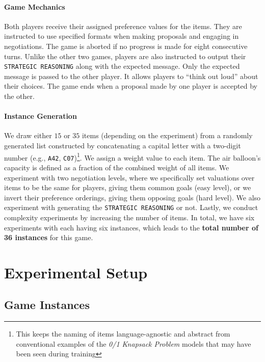 \documentclass[11pt]{article}
\begin{document}
\paragraph{Game Mechanics}
Both players receive their assigned preference values for the items. They are instructed to use specified formats when making proposals and engaging in negotiations. The game is aborted if no progress is made for eight consecutive turns. 
Unlike the other two games, players are also instructed to output their \texttt{STRATEGIC REASONING} along with the expected message. Only the expected message is passed to the other player. It allows players to ``think out loud'' about their choices. The game ends when a proposal made by one player is accepted by the other.

\paragraph{Instance Generation}

We draw either $15$ or $35$ items (depending on the experiment) from a randomly generated list constructed by concatenating a capital letter with a two-digit number (e.g., \texttt{A42}, \texttt{C07})\footnote{This keeps the naming of items language-agnostic and abstract from conventional examples of the \textit{0/1 Knapsack Problem} models that may have been seen during training}. We assign a weight value to each item. The air balloon's capacity is defined as a fraction of the combined weight of all items. We experiment with two negotiation levels, where we specifically set valuations over items to be the same for players, giving them common goals (easy level), or we invert their preference orderings, giving them opposing goals (hard level). We also experiment with generating the \texttt{STRATEGIC REASONING} or not. Lastly, we conduct complexity experiments by increasing the number of items. In total, we have six experiments with each having six instances, which leads to the \textbf{total number of 36 instances} for this game.



\section{Experimental Setup}\label{sec:experimental_setup}

\subsection{Game Instances}
\end{document}
